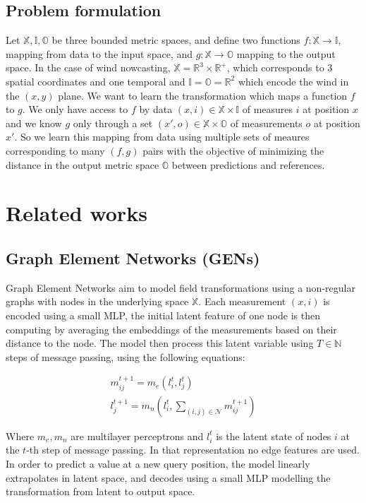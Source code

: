 \documentclass[a4paper,10pt]{article}
\begin{document}
\subsection{Problem formulation}

Let $\mathbb{X}, \mathbb{I}, \mathbb{O}$ be three bounded metric spaces, and define two functions $f : \mathbb{X}\rightarrow \mathbb{I}$, mapping from data to the input space, and $g : \mathbb{X}\rightarrow \mathbb{O}$ mapping to the output space.
In the case of wind nowcasting, $\mathbb{X} = \mathbb{R}^{3} \times \mathbb{R}^{+}$, which corresponds to 3 spatial coordinates and one temporal and $\mathbb{I} = \mathbb{O} = \mathbb{R}^{2}$ which encode the wind in the $(x,y)$ plane.
We want to learn the transformation which maps a function $f$ to $g$.
We only have access to $f$ by data $(x, i)  \in \mathbb{X} \times \mathbb{I}$ of measures $i$ at position $x$ and we know $g$ only through a set $(x', o) \in \mathbb{X} \times \mathbb{O}$ of measurements $o$ at position $x'$.
So we learn this mapping from data using multiple sets of meaures corresponding to many $(f,g)$ pairs with the objective of minimizing the distance in the output metric space $\mathbb{O}$ between predictions and references.

\section{Related works}


\subsection{Graph Element Networks (GENs)} \label{ssec:gen}
Graph Element Networks \cite{alet2019gen} aim to model field transformations using a non-regular graphs with nodes in the underlying space $\mathbb{X}$. Each measurement $(x, i)$ is encoded using a small MLP, the initial latent feature of one node is then computing by averaging the embeddings of the measurements based on their distance to the node. The model then process this latent variable using $T \in \mathbb{N}$ steps of message passing, using the following equations:

\begin{align}
  m_{ij}^{t + 1} = m_e(l_{i}^{t}, l_{j}^{t}) \\
  l_{j}^{t + 1} = m_{n}(l_{i}^{t}, \sum_{(i,j) \in \mathcal{N}} m_{ij}^{t + 1})
\end{align}

Where $m_e, m_n$ are multilayer perceptrons and $l_{i}^{t}$ is the latent state of nodes $i$ at the $t$-th step of message passing. In that representation no edge features are used.
In order to predict a value at a new query position, the model linearly extrapolates in latent space, and decodes using a small MLP modelling the transformation from latent to output space.
\end{document}
